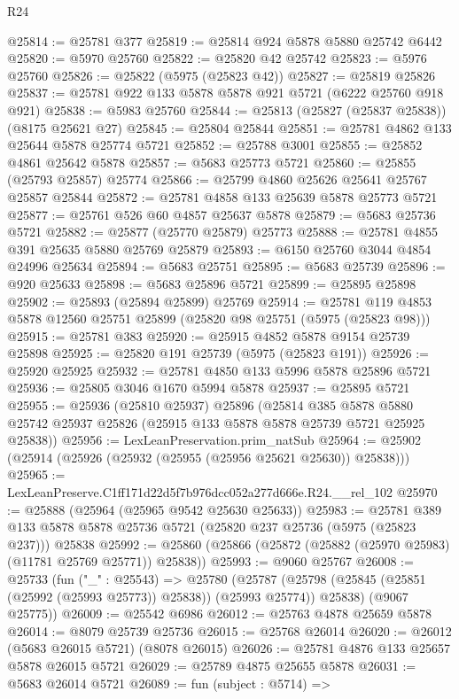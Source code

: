\begin{lexlean}{R24}
\begin{coremodule}
@25814 := @25781 @377
@25819 := @25814 @924 @5878 @5880 @25742 @6442
@25820 := @5970 @25760
@25822 := @25820 @42 @25742
@25823 := @5976 @25760
@25826 := @25822 (@5975 (@25823 @42))
@25827 := @25819 @25826
@25837 := @25781 @922 @133 @5878 @5878 @921 @5721 (@6222 @25760 @918 @921)
@25838 := @5983 @25760
@25844 := @25813 (@25827 (@25837 @25838)) (@8175 @25621 @27)
@25845 := @25804 @25844
@25851 := @25781 @4862 @133 @25644 @5878 @25774 @5721
@25852 := @25788 @3001
@25855 := @25852 @4861 @25642 @5878
@25857 := @5683 @25773 @5721
@25860 := @25855 (@25793 @25857) @25774
@25866 := @25799 @4860 @25626 @25641 @25767 @25857 @25844
@25872 := @25781 @4858 @133 @25639 @5878 @25773 @5721
@25877 := @25761 @526 @60 @4857 @25637 @5878
@25879 := @5683 @25736 @5721
@25882 := @25877 (@25770 @25879) @25773
@25888 := @25781 @4855 @391 @25635 @5880 @25769 @25879
@25893 := @6150 @25760 @3044 @4854 @24996 @25634
@25894 := @5683 @25751
@25895 := @5683 @25739
@25896 := @920 @25633
@25898 := @5683 @25896 @5721
@25899 := @25895 @25898
@25902 := @25893 (@25894 @25899) @25769
@25914 := @25781 @119 @4853 @5878 @12560 @25751 @25899 (@25820 @98 @25751 (@5975 (@25823 @98)))
@25915 := @25781 @383
@25920 := @25915 @4852 @5878 @9154 @25739 @25898
@25925 := @25820 @191 @25739 (@5975 (@25823 @191))
@25926 := @25920 @25925
@25932 := @25781 @4850 @133 @5996 @5878 @25896 @5721
@25936 := @25805 @3046 @1670 @5994 @5878
@25937 := @25895 @5721
@25955 := @25936
    (@25810 @25937)
    @25896
    (@25814
      @385
      @5878
      @5880
      @25742
      @25937
      @25826
      (@25915 @133 @5878 @5878 @25739 @5721 @25925 @25838))
@25956 := LexLeanPreservation.prim_natSub
@25964 := @25902 (@25914 (@25926 (@25932 (@25955 (@25956 @25621 @25630)) @25838)))
@25965 := LexLeanPreserve.C1ff171d22d5f7b976dcc052a277d666e.R24.__rel_102
@25970 := @25888 (@25964 (@25965 @9542 @25630 @25633))
@25983 := @25781
    @389
    @133
    @5878
    @5878
    @25736
    @5721
    (@25820 @237 @25736 (@5975 (@25823 @237)))
    @25838
@25992 := @25860 (@25866 (@25872 (@25882 (@25970 @25983) (@11781 @25769 @25771)) @25838))
@25993 := @9060 @25767
@26008 := @25733
    (fun ("_" : @25543) =>
    @25780
      (@25787 (@25798 (@25845 (@25851 (@25992 (@25993 @25773)) @25838)) (@25993 @25774)) @25838)
      (@9067 @25775))
@26009 := @25542 @6986
@26012 := @25763 @4878 @25659 @5878
@26014 := @8079 @25739 @25736
@26015 := @25768 @26014
@26020 := @26012 (@5683 @26015 @5721) (@8078 @26015)
@26026 := @25781 @4876 @133 @25657 @5878 @26015 @5721
@26029 := @25789 @4875 @25655 @5878
@26031 := @5683 @26014 @5721
@26089 := fun (subject : @5714) =>

\end{coremodule}
\end{lexlean}
